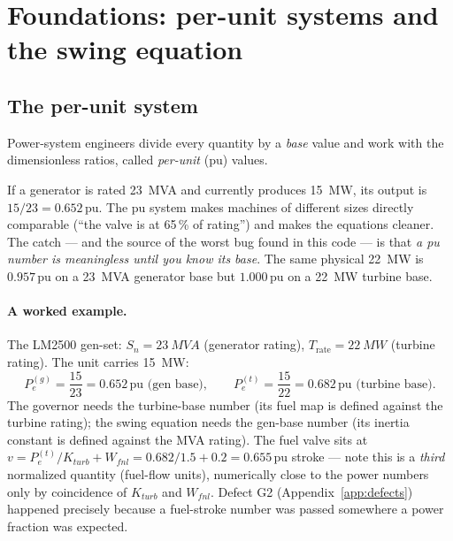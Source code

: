 \documentclass[11pt]{article}
\newcommand{\pu}{\,\text{pu}}
\begin{document}
\section{Foundations: per-unit systems and the swing equation}

\subsection{The per-unit system}
\label{sec:pu}

Power-system engineers divide every quantity by a \emph{base} value and
work with the dimensionless ratios, called \emph{per-unit} (pu) values.

\begin{novicebox}
If a generator is rated \SI{23}{MVA} and currently produces \SI{15}{MW},
its output is $15/23 = 0.652\pu$. The pu system makes machines of
different sizes directly comparable (``the valve is at 65\,\% of rating'')
and makes the equations cleaner. The catch --- and the source of the worst
bug found in this code --- is that \emph{a pu number is meaningless until
you know its base}. The same physical \SI{22}{MW} is $0.957\pu$ on a
\SI{23}{MVA} generator base but $1.000\pu$ on a \SI{22}{MW} turbine base.
\end{novicebox}

\paragraph{A worked example.} The LM2500 gen-set: $S_n = \SI{23}{MVA}$
(generator rating), $T_\text{rate} = \SI{22}{MW}$ (turbine rating). The
unit carries \SI{15}{MW}:
\[
  P_e^{(g)} = \frac{15}{23} = 0.652\pu \text{ (gen base)}, \qquad
  P_e^{(t)} = \frac{15}{22} = 0.682\pu \text{ (turbine base)}.
\]
The governor needs the turbine-base number (its fuel map is defined
against the turbine rating); the swing equation needs the gen-base number
(its inertia constant is defined against the MVA rating). The fuel valve
sits at $v = P_e^{(t)}/K_{turb} + W_{fnl} = 0.682/1.5 + 0.2 = 0.655\pu$
stroke --- note this is a \emph{third} normalized quantity (fuel-flow
units), numerically close to the power numbers only by coincidence of
$K_{turb}$ and $W_{fnl}$. Defect G2 (Appendix~\ref{app:defects}) happened
precisely because a fuel-stroke number was passed somewhere a power
fraction was expected.
\end{document}
